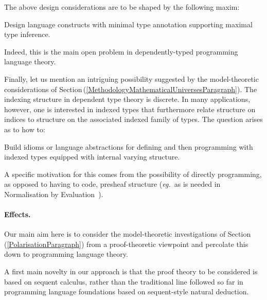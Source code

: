 \documentclass[11pt,twocolumn]{article}
\newcounter{CC}
\newenvironment{resenumerate}
  {\begin{list}{[\textbf{\arabic{CC}]}}
  {\usecounter{CC}
   \setlength{\topsep}{2pt}
   \setlength{\partopsep}{2pt}
   \setlength{\itemsep}{2.5pt}
   \setlength{\parsep}{2.5pt}
   \setlength{\leftmargin}{1.65em}
   \setlength{\labelwidth}{1.15em}
 }}
  {\end{list}}
\newcommand{\hide}[1]{}
\newcommand{\pref}[1]{\,(\ref{#1})}
\newcommand{\eg}{\emph{eg.}}
\begin{document}
\hide{
Dually, we will also:
\begin{resenumerate}\setcounter{CC}{4}
\item
  Develop programming primitives corresponding to coinduction proof
  principles.
\end{resenumerate}
These have received less attention.
}

The above design considerations are to be shaped by the following maxim:
\begin{resenumerate}\setcounter{CC}{4}%
\item
  Design language constructs with minimal type annotation supporting
  maximal type inference.
\end{resenumerate}
Indeed, this is the main open problem in dependently-typed programming language
theory.

Finally, let us mention an intriguing possibility suggested by the
model-theoretic considerations of
Section\pref{MethodologyMathematicalUniversesParagraph}.  The indexing
structure in dependent type theory is discrete.  In many applications,
however, one is interested in indexed types that furthermore relate
structure on indices to structure on the associated indexed family of types.
The question arises as to how to:
\begin{resenumerate}\setcounter{CC}{5}%
\item
  Build idioms or language abstractions for defining and then programming
  with indexed types equipped with internal varying structure.
\end{resenumerate}
A specific motivation for this comes from the possibility of directly
programming, as opposed to having to code, presheaf structure (\eg~as is
needed in Normalisation by Evaluation~\cite{FiorePPDP}).

\paragraph{Effects.}
\label{ProgrammingEffectsParagraph}

Our main aim here is to consider the model-theoretic investigations of
Section\pref{PolarisationParagraph} from a proof-theoretic viewpoint and
percolate this down to programming language theory.

A first main novelty in our approach is that the proof theory to be
considered is based on sequent calculus, rather than the traditional line
followed so far in programming language foundations based on sequent-style
natural deduction.
\end{document}
